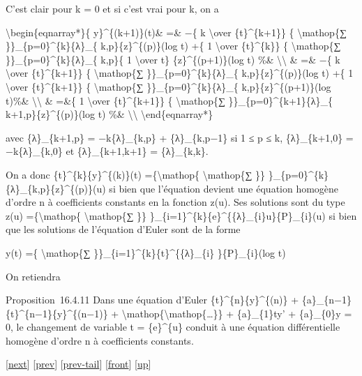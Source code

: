 \documentclass[]{article}
\begin{document}
C'est clair pour k = 0 et si c'est vrai pour k, on a

\textbackslash{}begin\{eqnarray*\}\{ y\}\^{}\{(k+1)\}(t)\& =\& −\{ k
\textbackslash{}over \{t\}\^{}\{k+1\}\} \{ \textbackslash{}mathop\{∑
\}\}\_\{p=0\}\^{}\{k\}\{λ\}\_\{ k,p\}\{z\}\^{}\{(p)\}(log t) +\{ 1
\textbackslash{}over \{t\}\^{}\{k\}\} \{ \textbackslash{}mathop\{∑
\}\}\_\{p=0\}\^{}\{k\}\{λ\}\_\{ k,p\}\{ 1 \textbackslash{}over t\}
\{z\}\^{}\{(p+1)\}(log t) \%\& \textbackslash{}\textbackslash{} \& =\&
−\{ k \textbackslash{}over \{t\}\^{}\{k+1\}\} \{
\textbackslash{}mathop\{∑ \}\}\_\{p=0\}\^{}\{k\}\{λ\}\_\{
k,p\}\{z\}\^{}\{(p)\}(log t) +\{ 1 \textbackslash{}over
\{t\}\^{}\{k+1\}\} \{ \textbackslash{}mathop\{∑
\}\}\_\{p=0\}\^{}\{k\}\{λ\}\_\{ k,p\}\{z\}\^{}\{(p+1)\}(log t)\%\&
\textbackslash{}\textbackslash{} \& =\&\{ 1 \textbackslash{}over
\{t\}\^{}\{k+1\}\} \{ \textbackslash{}mathop\{∑
\}\}\_\{p=0\}\^{}\{k+1\}\{λ\}\_\{ k+1,p\}\{z\}\^{}\{(p)\}(log t) \%\&
\textbackslash{}\textbackslash{} \textbackslash{}end\{eqnarray*\}

avec \{λ\}\_\{k+1,p\} = −k\{λ\}\_\{k,p\} + \{λ\}\_\{k,p−1\} si 1 ≤ p ≤
k, \{λ\}\_\{k+1,0\} = −k\{λ\}\_\{k,0\} et \{λ\}\_\{k+1,k+1\} =
\{λ\}\_\{k,k\}.

On a donc \{t\}\^{}\{k\}\{y\}\^{}\{(k)\}(t) =\{\textbackslash{}mathop\{
\textbackslash{}mathop\{∑ \}\}
\}\_\{p=0\}\^{}\{k\}\{λ\}\_\{k,p\}\{z\}\^{}\{(p)\}(u) si bien que
l'équation devient une équation homogène d'ordre n à coefficients
constants en la fonction z(u). Ses solutions sont du type z(u)
=\{\textbackslash{}mathop\{ \textbackslash{}mathop\{∑ \}\}
\}\_\{i=1\}\^{}\{k\}\{e\}\^{}\{\{λ\}\_\{i\}u\}\{P\}\_\{i\}(u) si bien
que les solutions de l'équation d'Euler sont de la forme

y(t) =\{ \textbackslash{}mathop\{∑
\}\}\_\{i=1\}\^{}\{k\}\{t\}\^{}\{\{λ\}\_\{i\} \}\{P\}\_\{i\}(log t)

On retiendra

Proposition~16.4.11 Dans une équation d'Euler
\{t\}\^{}\{n\}\{y\}\^{}\{(n)\} +
\{a\}\_\{n−1\}\{t\}\^{}\{n−1\}\{y\}\^{}\{(n−1)\} +
\textbackslash{}mathop\{\textbackslash{}mathop\{\ldots{}\}\} +
\{a\}\_\{1\}ty' + \{a\}\_\{0\}y = 0, le changement de variable t =
\{e\}\^{}\{u\} conduit à une équation différentielle homogène d'ordre n
à coefficients constants.

{[}\href{coursse90.html}{next}{]} {[}\href{coursse88.html}{prev}{]}
{[}\href{coursse88.html\#tailcoursse88.html}{prev-tail}{]}
{[}\href{coursse89.html}{front}{]}
{[}\href{coursch17.html\#coursse89.html}{up}{]}
\end{document}
